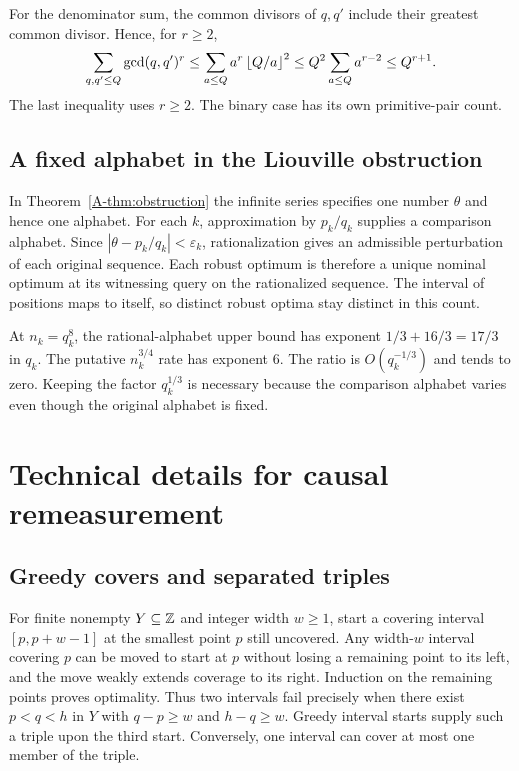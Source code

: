For the denominator sum, the common divisors of $q,q'$ include their greatest common divisor. Hence, for $r\ge2$,
\[
 \sum_{q,q'\le Q}\gcd(q,q')^r
 \le \sum_{a\le Q}a^r\left\lfloor Q/a\right\rfloor^2
 \le Q^2\sum_{a\le Q}a^{r-2}\le Q^{r+1}.
\]
The last inequality uses $r\ge2$. The binary case has its own primitive-pair count.

\subsection{A fixed alphabet in the Liouville obstruction}
In Theorem~\ref{A-thm:obstruction} the infinite series specifies one number $\theta$ and hence one alphabet. For each $k$, approximation by $p_k/q_k$ supplies a comparison alphabet. Since $|\theta-p_k/q_k|<\varepsilon_k$, rationalization gives an admissible perturbation of each original sequence. Each robust optimum is therefore a unique nominal optimum at its witnessing query on the rationalized sequence. The interval of positions maps to itself, so distinct robust optima stay distinct in this count.

At $n_k=q_k^8$, the rational-alphabet upper bound has exponent $1/3+16/3=17/3$ in $q_k$. The putative $n_k^{3/4}$ rate has exponent $6$. The ratio is $O(q_k^{-1/3})$ and tends to zero. Keeping the factor $q_k^{1/3}$ is necessary because the comparison alphabet varies even though the original alphabet is fixed.

\section{Technical details for causal remeasurement}\label{app:timingproof}
\subsection{Greedy covers and separated triples}
For finite nonempty $Y\subseteq\mathbb Z$ and integer width $w\ge1$, start a covering interval $[p,p+w-1]$ at the smallest point $p$ still uncovered. Any width-$w$ interval covering $p$ can be moved to start at $p$ without losing a remaining point to its left, and the move weakly extends coverage to its right. Induction on the remaining points proves optimality. Thus two intervals fail precisely when there exist $p<q<h$ in $Y$ with $q-p\ge w$ and $h-q\ge w$. Greedy interval starts supply such a triple upon the third start. Conversely, one interval can cover at most one member of the triple.


